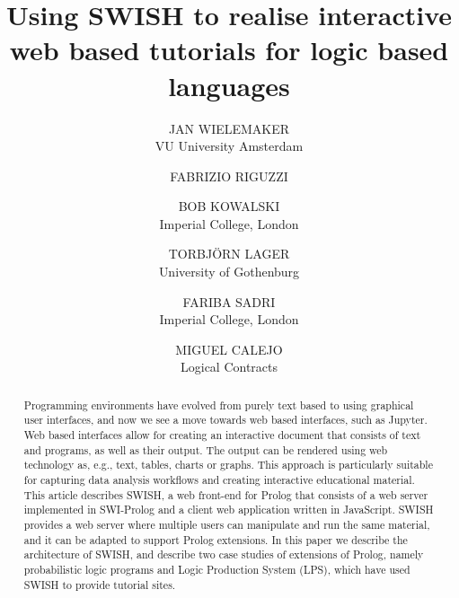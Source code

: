 \documentclass{tlp}
\begin{document}


\title{Using SWISH to realise interactive web based tutorials for
       logic based languages}

\author[J. Wielemaker et al.]
{JAN WIELEMAKER \\
VU University Amsterdam\\
\and
 FABRIZIO RIGUZZI \\
\and
BOB KOWALSKI \\
Imperial College, London\\
\and
TORBJ\"ORN LAGER \\
University of Gothenburg\\
\and
FARIBA SADRI \\
Imperial College, London\\
\and
MIGUEL CALEJO \\
Logical Contracts\\
}

\pagerange{\pageref{firstpage}--\pageref{lastpage}}
\setcounter{page}{1}

\maketitle
\begin{abstract}
Programming environments have evolved from purely text based to using
graphical user interfaces, and now we see a move towards web based
interfaces, such as Jupyter. Web based interfaces allow for creating an
interactive document that consists of text and programs, as well as
their output. The output can be rendered using web technology as, e.g.,
text, tables, charts or graphs. This approach is particularly suitable
for capturing data analysis workflows and creating interactive
educational material. This article describes SWISH, a web front-end for
Prolog that consists of a web server implemented in SWI-Prolog and a
client web application written in JavaScript. SWISH provides a web
server where multiple users can manipulate and run the same material,
and it can be adapted to support Prolog extensions. In this paper we
describe the architecture of SWISH, and describe two case studies of
extensions of Prolog, namely probabilistic logic programs and Logic
Production System (LPS), which have used SWISH to provide tutorial
sites.
\end{abstract}
\end{document}

